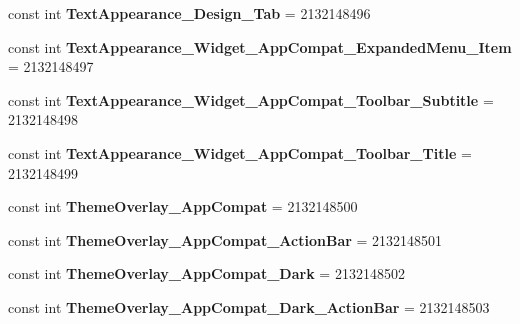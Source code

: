 \begin{DoxyCompactItemize}
\item 
\mbox{\label{classst_delivery_1_1_resource_1_1_style_a135d58ef9ab9c493f4454959746e8e29}} 
const int {\bfseries Text\+Appearance\+\_\+\+Design\+\_\+\+Tab} = 2132148496
\item 
\mbox{\label{classst_delivery_1_1_resource_1_1_style_a85437a05034d622f66a3cd9e101cb424}} 
const int {\bfseries Text\+Appearance\+\_\+\+Widget\+\_\+\+App\+Compat\+\_\+\+Expanded\+Menu\+\_\+\+Item} = 2132148497
\item 
\mbox{\label{classst_delivery_1_1_resource_1_1_style_a2da61bd8023b0485c6bef5a89c54831b}} 
const int {\bfseries Text\+Appearance\+\_\+\+Widget\+\_\+\+App\+Compat\+\_\+\+Toolbar\+\_\+\+Subtitle} = 2132148498
\item 
\mbox{\label{classst_delivery_1_1_resource_1_1_style_a4a7ba24d4e2f5fd0daf97282db4379d6}} 
const int {\bfseries Text\+Appearance\+\_\+\+Widget\+\_\+\+App\+Compat\+\_\+\+Toolbar\+\_\+\+Title} = 2132148499
\item 
\mbox{\label{classst_delivery_1_1_resource_1_1_style_ae237178c0e539ed97be0f028b029a268}} 
const int {\bfseries Theme\+Overlay\+\_\+\+App\+Compat} = 2132148500
\item 
\mbox{\label{classst_delivery_1_1_resource_1_1_style_a7495c183c0baf4ce50094aa63f7ce1da}} 
const int {\bfseries Theme\+Overlay\+\_\+\+App\+Compat\+\_\+\+Action\+Bar} = 2132148501
\item 
\mbox{\label{classst_delivery_1_1_resource_1_1_style_ad086264d37573852d1f3459bc46fcee2}} 
const int {\bfseries Theme\+Overlay\+\_\+\+App\+Compat\+\_\+\+Dark} = 2132148502
\item 
\mbox{\label{classst_delivery_1_1_resource_1_1_style_a7d7fb06bd0b26a59439df15024b2acaa}} 
const int {\bfseries Theme\+Overlay\+\_\+\+App\+Compat\+\_\+\+Dark\+\_\+\+Action\+Bar} = 2132148503
\item 

\end{DoxyCompactItemize}
